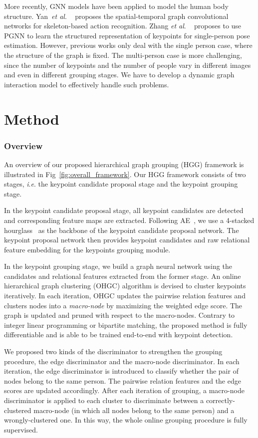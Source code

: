 \documentclass[runningheads]{llncs}
\newcommand{\etal}{\textit{et al}. }
\newcommand{\ie}{\textit{i}.\textit{e}. }
\begin{document}
	More recently, GNN models have been applied to model the human body structure. Yan~\etal~\cite{yan2018spatial} proposes the spatial-temporal graph convolutional networks for skeleton-based action recognition. Zhang \etal~\cite{zhang2019human} proposes to use PGNN to learn the structured representation of keypoints for single-person pose estimation. However, previous works only deal with the single person case, where the structure of the graph is fixed. The multi-person case is more challenging, since the number of keypoints and the number of people vary in different images and even in different grouping stages. We have to develop a dynamic graph interaction model to effectively handle such problems.
	
	\section{Method}
	
	\subsubsection{Overview}
	An overview of our proposed hierarchical graph grouping (HGG) framework is illustrated in Fig~\ref{fig:overall_framework}. Our HGG framework consists of two stages, \ie the keypoint candidate proposal stage and the keypoint grouping stage. 
	
	In the keypoint candidate proposal stage, all keypoint candidates are detected and corresponding feature maps are extracted. Following AE~\cite{newell2017associative}, we use a 4-stacked hourglass~\cite{newell2016stacked} as the backbone of the keypoint candidate proposal network. The keypoint proposal network then provides keypoint candidates and raw relational feature embedding for the keypoints grouping module.
	
	In the keypoint grouping stage, we build a graph neural network using the candidates and relational features extracted from the former stage. An online hierarchical graph clustering (OHGC) algorithm is devised to cluster keypoints iteratively. In each iteration, OHGC updates the pairwise relation features and clusters nodes into a \textit{macro-node} by maximizing the weighted edge score. The graph is updated and pruned with respect to the macro-nodes. Contrary to integer linear programming or bipartite matching, the proposed method is fully differentiable and is able to be trained end-to-end with keypoint detection.
	
	We proposed two kinds of the discriminator to strengthen the grouping procedure, the edge discriminator and the macro-node discriminator. In each iteration, the edge discriminator is introduced to classify whether the pair of nodes belong to the same person. The pairwise relation features and the edge scores are updated accordingly. After each iteration of grouping, a macro-node discriminator is applied to each cluster to discriminate between a correctly-clustered macro-node (in which all nodes belong to the same person) and a wrongly-clustered one. In this way, the whole online grouping procedure is fully supervised.
	
\end{document}
